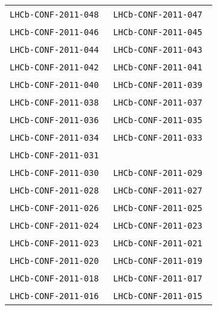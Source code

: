 \begin{center}
\begin{longtable}{ll}
\texttt{LHCb-CONF-2011-048}~\cite{LHCb-CONF-2011-048} & 
\texttt{LHCb-CONF-2011-047}~\cite{LHCb-CONF-2011-047} \\
\texttt{LHCb-CONF-2011-046}~\cite{LHCb-CONF-2011-046} & 
\texttt{LHCb-CONF-2011-045}~\cite{LHCb-CONF-2011-045} \\ 
\texttt{LHCb-CONF-2011-044}~\cite{LHCb-CONF-2011-044} &
\texttt{LHCb-CONF-2011-043}~\cite{LHCb-CONF-2011-043} \\ 
\texttt{LHCb-CONF-2011-042}~\cite{LHCb-CONF-2011-042} &
\texttt{LHCb-CONF-2011-041}~\cite{LHCb-CONF-2011-041} \\ 
\texttt{LHCb-CONF-2011-040}~\cite{LHCb-CONF-2011-040} &
\texttt{LHCb-CONF-2011-039}~\cite{LHCb-CONF-2011-039} \\
\texttt{LHCb-CONF-2011-038}~\cite{LHCb-CONF-2011-038} &
\texttt{LHCb-CONF-2011-037}~\cite{LHCb-CONF-2011-037} \\
\texttt{LHCb-CONF-2011-036}~\cite{LHCb-CONF-2011-036} &
\texttt{LHCb-CONF-2011-035}~\cite{LHCb-CONF-2011-035} \\
\texttt{LHCb-CONF-2011-034}~\cite{LHCb-CONF-2011-034} &
\texttt{LHCb-CONF-2011-033}~\cite{LHCb-CONF-2011-033} \\
\texttt{LHCb-CONF-2011-031}~\cite{LHCb-CONF-2011-031} \\
\texttt{LHCb-CONF-2011-030}~\cite{LHCb-CONF-2011-030} &
\texttt{LHCb-CONF-2011-029}~\cite{LHCb-CONF-2011-029} \\
\texttt{LHCb-CONF-2011-028}~\cite{LHCb-CONF-2011-028} &
\texttt{LHCb-CONF-2011-027}~\cite{LHCb-CONF-2011-027} \\
\texttt{LHCb-CONF-2011-026}~\cite{LHCb-CONF-2011-026} &
\texttt{LHCb-CONF-2011-025}~\cite{LHCb-CONF-2011-025} \\
\texttt{LHCb-CONF-2011-024}~\cite{LHCb-CONF-2011-024} &
\texttt{LHCb-CONF-2011-023}~\cite{LHCb-CONF-2011-023} \\
\texttt{LHCb-CONF-2011-023}~\cite{LHCb-CONF-2011-022} &
\texttt{LHCb-CONF-2011-021}~\cite{LHCb-CONF-2011-021} \\
\texttt{LHCb-CONF-2011-020}~\cite{LHCb-CONF-2011-020} &
\texttt{LHCb-CONF-2011-019}~\cite{LHCb-CONF-2011-019} \\
\texttt{LHCb-CONF-2011-018}~\cite{LHCb-CONF-2011-018} &
\texttt{LHCb-CONF-2011-017}~\cite{LHCb-CONF-2011-017} \\
\texttt{LHCb-CONF-2011-016}~\cite{LHCb-CONF-2011-016} &
\texttt{LHCb-CONF-2011-015}~\cite{LHCb-CONF-2011-015} \\

\end{longtable}
\end{center}

